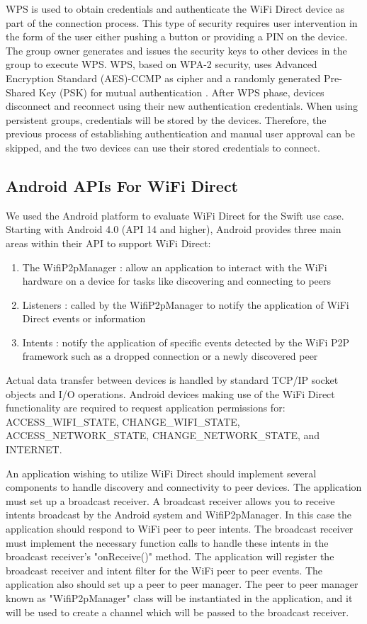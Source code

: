 \documentclass[10pt,twocolumn]{article}
\begin{document}
WPS is used to obtain credentials and authenticate the WiFi Direct device as part of the connection process.  
This type of security requires user intervention in the form of the user either pushing a button or providing a PIN on the device.
The group owner generates and issues the security keys to other devices in the group to execute WPS. 
WPS, based on WPA-2 security, uses Advanced Encryption Standard (AES)-CCMP as cipher and a randomly generated Pre-Shared Key (PSK) for mutual authentication \cite{wifiwhitepaper}.
After WPS phase, devices disconnect and reconnect using their new authentication credentials.
When using persistent groups, credentials will be stored by the devices.
Therefore, the previous process of establishing authentication and manual user approval can be skipped, and the two devices can use their stored credentials to connect.

\subsection{Android APIs For WiFi Direct}
\label{sec:Android APIs For WiFi Direct}
We used the Android platform to evaluate WiFi Direct for the Swift use case.
Starting with Android 4.0 (API 14 and higher), Android provides three main areas within their API to support WiFi Direct:
\begin{enumerate}
\item The WifiP2pManager : allow an application to interact with the WiFi hardware on a device for tasks like discovering and connecting to peers
\item Listeners : called by the WifiP2pManager to notify the application of WiFi Direct events or information
\item Intents : notify the application of specific events detected by the WiFi P2P framework such as a dropped connection or a newly discovered peer
\end{enumerate} 

Actual data transfer between devices is handled by standard TCP/IP socket objects and I/O operations.
Android devices making use of the WiFi Direct functionality are required to request application permissions for: ACCESS\_WIFI\_STATE, CHANGE\_WIFI\_STATE, ACCESS\_NETWORK\_STATE, CHANGE\_NETWORK\_STATE, and INTERNET. \cite{androidoverview}

An application wishing to utilize WiFi Direct should implement several components to handle discovery and connectivity to peer devices.
The application must set up a broadcast receiver. 
A broadcast receiver allows you to receive intents broadcast by the Android system and WifiP2pManager. 
In this case the application should respond to WiFi peer to peer intents.
The broadcast receiver must implement the necessary function calls to handle these intents in the broadcast receiver's "onReceive()" method.
The application will register the broadcast receiver and intent filter for the WiFi peer to peer events.
The application also should set up a peer to peer manager. 
The peer to peer manager known as "WifiP2pManager" class will be instantiated in the application, and it will be used to create a channel which will be passed to the broadcast receiver.
\end{document}
